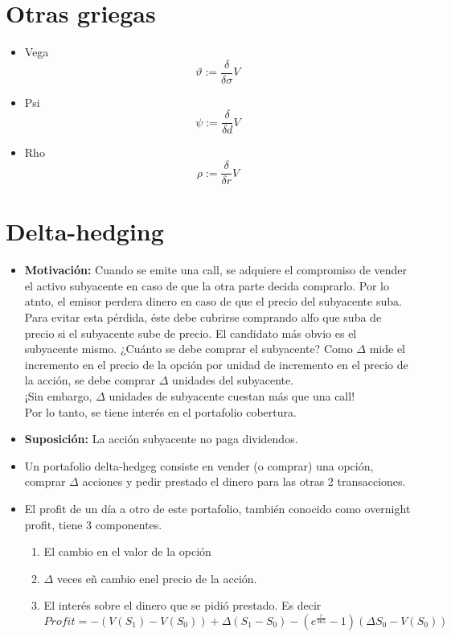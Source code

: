 \documentclass[12pts]{extarticle}
\begin{document}
\section{Otras griegas}
\begin{itemize}
\item Vega
$$   \vartheta :=\frac{\delta}{\delta \sigma}V $$ 
\item Psi
$$  \psi := \frac{\delta}{\delta d}V   $$
\item Rho
$$   \rho := \frac{\delta}{\delta r}V  $$
\end{itemize}

\section{Delta-hedging}
\begin{itemize}
\item \textbf{Motivación:} Cuando se emite una call, se adquiere el compromiso de vender el activo subyacente en caso de que la otra parte decida comprarlo. Por lo atnto, el emisor perdera dinero en caso de que el precio del subyacente suba. Para evitar esta pérdida, éste debe cubrirse comprando alfo que suba de precio si el subyacente sube de precio. El candidato más obvio es el subyacente mismo. ¿Cuánto se debe comprar el subyacente? Como $\Delta$ mide el incremento en el precio de la opción por unidad de incremento en el precio de la acción, se debe comprar $\Delta$ unidades del subyacente. \\ ¡Sin embargo, $\Delta$ unidades de subyacente cuestan más que una call! \\ Por lo tanto, se tiene interés en el portafolio cobertura. 
\item \textbf{Suposición:} La acción subyacente no paga dividendos. 
\item Un portafolio delta-hedgeg consiste en vender (o comprar) una opción, comprar $\Delta$ acciones y pedir prestado el dinero para las otras 2 transacciones. 
\item El profit de un día a otro de este portafolio, también conocido como overnight profit, tiene 3 componentes.
 \begin{enumerate}
\item El cambio en el valor de la opción
\item $\Delta$ veces eñ cambio enel precio de la acción.
\item El interés sobre el dinero que se pidió prestado. Es decir $$Profit=-(V(S_1)-V(S_0))+ \Delta(S_1-S_0)-(e^{\frac{r}{365}}-1)(\Delta S_0-V(S_0))$$

\end{enumerate}
\end{itemize}
\end{document}
